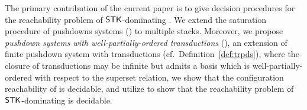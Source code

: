 The primary contribution of the current paper is to give decision procedures for the reachability problem of $\mathsf{STK}$-dominating {\AMASS}. We extend the saturation procedure of pushdowns systems (\PDS) to multiple stacks.  Moreover, we propose \emph{pushdown systems with well-partially-ordered transductions} (\WOTrPDS), an extension of finite pushdown system with transductions (cf.\ Definition~\ref{def:trpds}), where the closure of transductions may be infinite but admits a basis which is well-partially-ordered with respect to the superset relation, we show that the configuration reachability of {\WOTrPDS} is decidable, and utilize {\WOTrPDS} to show that the reachability problem of $\mathsf{STK}$-dominating {\AMASS} is decidable.

	
